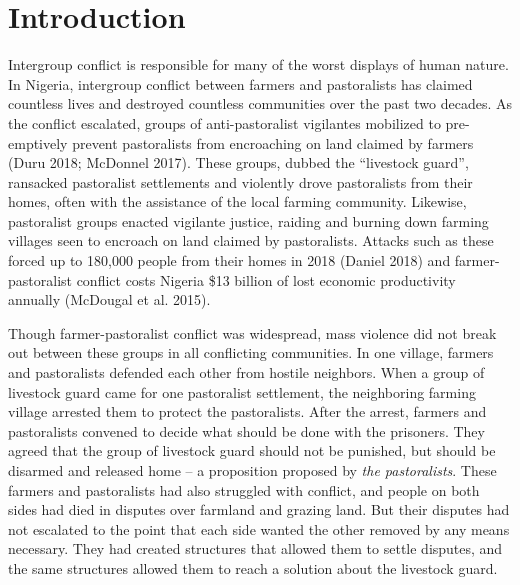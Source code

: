 \documentclass[11pt]{article}
\begin{document}
\section{Introduction}\label{introduction}

Intergroup conflict is responsible for many of the worst displays of
human nature. In Nigeria, intergroup conflict between farmers and
pastoralists has claimed countless lives and destroyed countless
communities over the past two decades. As the conflict escalated, groups
of anti-pastoralist vigilantes mobilized to pre-emptively prevent
pastoralists from encroaching on land claimed by farmers (Duru 2018;
McDonnel 2017). These groups, dubbed the ``livestock guard'', ransacked
pastoralist settlements and violently drove pastoralists from their
homes, often with the assistance of the local farming community.
Likewise, pastoralist groups enacted vigilante justice, raiding and
burning down farming villages seen to encroach on land claimed by
pastoralists. Attacks such as these forced up to 180,000 people from
their homes in 2018 (Daniel 2018) and farmer-pastoralist conflict costs
Nigeria \$13 billion of lost economic productivity annually (McDougal et
al. 2015).

Though farmer-pastoralist conflict was widespread, mass violence did not
break out between these groups in all conflicting communities. In one
village, farmers and pastoralists defended each other from hostile
neighbors. When a group of livestock guard came for one pastoralist
settlement, the neighboring farming village arrested them to protect the
pastoralists. After the arrest, farmers and pastoralists convened to
decide what should be done with the prisoners. They agreed that the
group of livestock guard should not be punished, but should be disarmed
and released home -- a proposition proposed by \emph{the pastoralists}.
These farmers and pastoralists had also struggled with conflict, and
people on both sides had died in disputes over farmland and grazing
land. But their disputes had not escalated to the point that each side
wanted the other removed by any means necessary. They had created
structures that allowed them to settle disputes, and the same structures
allowed them to reach a solution about the livestock guard.
\end{document}
